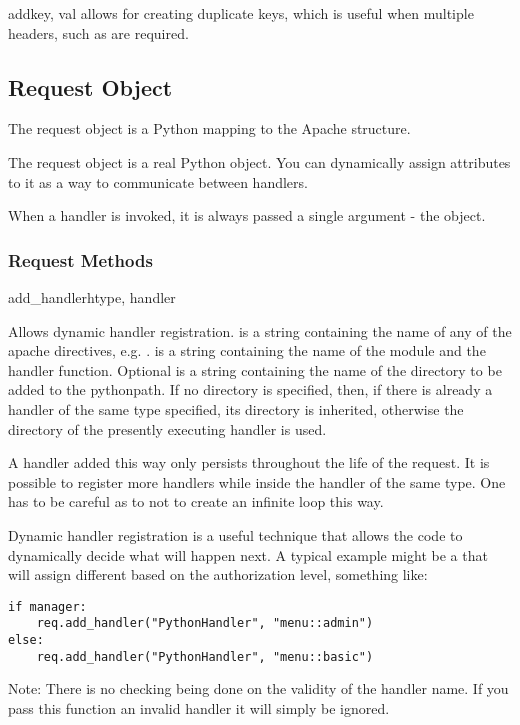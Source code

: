 \begin{methoddesc}[table]{add}{key, val}
 allows for creating duplicate keys, which is useful 
when multiple headers, such as  are required.
\end{methoddesc}

\subsection{Request Object\label{pyapi-mprequest}}

The request object is a Python mapping to the Apache
 structure. 

The request object is a real Python object. You can dynamically
assign attributes to it as a way to communicate between handlers.

When a handler is invoked, it is always passed a single argument - the
 object.

\subsubsection{Request Methods\label{pyapi-mprequest-meth}}

\begin{methoddesc}[Request]{add_handler}{htype, handler}

Allows dynamic handler registration.  is a string
containing the name of any of the apache 
directives, e.g. .  is a string
containing the name of the module and the handler function.  Optional
 is a string containing the name of the directory to be added
to the pythonpath. If no directory is specified, then, if there is
already a handler of the same type specified, its directory is
inherited, otherwise the directory of the presently executing handler
is used.
                  
A handler added this way only persists throughout the life of the
request. It is possible to register more handlers while inside the
handler of the same type. One has to be careful as to not to create an
infinite loop this way.

Dynamic handler registration is a useful technique that allows the
code to dynamically decide what will happen next. A typical example
might be a  that will assign different
 based on the authorization level, something like:

\begin{verbatim}
if manager:
    req.add_handler("PythonHandler", "menu::admin")
else:
    req.add_handler("PythonHandler", "menu::basic")
\end{verbatim}                              

Note: There is no checking being done on the validity of the handler
name. If you pass this function an invalid handler it will simply be
ignored.
\end{methoddesc}

